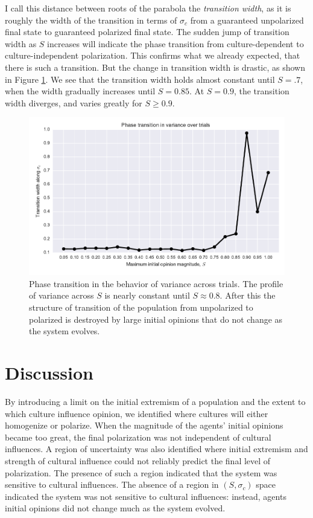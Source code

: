 \documentclass[11pt,letterpaper]{article}
\newcommand{\sigc}{\ensuremath{\sigma_c}}
\begin{document}
I call this distance between roots of the parabola the \textit{transition width},
as it is roughly the width of the transition in terms of $\sigc$ from 
a guaranteed unpolarized final state to guaranteed polarized final state. The
sudden jump of transition width as $S$ increases will indicate the phase 
transition from culture-dependent to culture-independent polarization. This
confirms what we already expected, that there is such a transition. But the
change in transition width is drastic, as shown in Figure \ref{fig:transition-widths}.
We see that the transition width holds almost constant until $S=.7$, when 
the width gradually increases until $S=0.85$. At $S=0.9$, the transition width
diverges, and varies greatly for $S \geq 0.9$.

\begin{figure}[h!]
  \centering
  \includegraphics[width=\textwidth]{figures/transition-widths.pdf}
  \caption{Phase transition in the behavior of variance across trials. The
  profile of variance across $S$ is nearly constant until $S\approx0.8$. After
  this the structure of transition of the population from unpolarized to 
  polarized is destroyed by large initial opinions that do not change as the
  system evolves.}
  \label{fig:transition-widths}
\end{figure}


\section{Discussion}
\label{sec:Discussion}

By introducing a limit on the initial extremism of a population and the
extent to which culture influence opinion, we identified where cultures will
either homogenize or polarize. When the magnitude of the agents' initial 
opinions became too great, the final polarization was not independent of 
cultural influences. A region of uncertainty was also identified where
initial extremism and strength of cultural influence could not reliably predict
the final level of polarization. The presence of such a region indicated that
the system was sensitive to cultural influences. The absence of a region in
$(S, \sigc)$ space indicated the system was not sensitive to cultural 
influences: instead, agents initial opinions did not change much as the 
system evolved.
\end{document}
